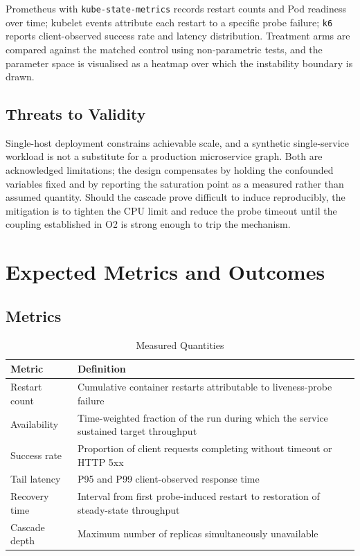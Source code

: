 \documentclass[conference]{IEEEtran}
\begin{document}
Prometheus with \texttt{kube-state-metrics} records restart counts and
Pod readiness over time; kubelet events attribute each restart to a
specific probe failure; \texttt{k6} reports client-observed success
rate and latency distribution. Treatment arms are compared against the
matched control using non-parametric tests, and the parameter space is
visualised as a heatmap over which the instability boundary is drawn.

\subsection{Threats to Validity}

Single-host deployment constrains achievable scale, and a synthetic
single-service workload is not a substitute for a production
microservice graph. Both are acknowledged limitations; the design
compensates by holding the confounded variables fixed and by reporting
the saturation point as a measured rather than assumed quantity.
Should the cascade prove difficult to induce reproducibly, the
mitigation is to tighten the CPU limit and reduce the probe timeout
until the coupling established in O2 is strong enough to trip the
mechanism.

\section{Expected Metrics and Outcomes}

\subsection{Metrics}

\begin{table}[h]
\centering
\caption{Measured Quantities}
\label{tab:metrics}
\footnotesize
\begin{tabular}{@{}p{}p{}@{}}
\toprule
\textbf{Metric} & \textbf{Definition} \\
\midrule
Restart count & Cumulative container restarts attributable to
liveness-probe failure \\
\addlinespace
Availability & Time-weighted fraction of the run during which the
service sustained target throughput \\
\addlinespace
Success rate & Proportion of client requests completing without
timeout or HTTP 5xx \\
\addlinespace
Tail latency & P95 and P99 client-observed response time \\
\addlinespace
Recovery time & Interval from first probe-induced restart to
restoration of steady-state throughput \\
\addlinespace
Cascade depth & Maximum number of replicas simultaneously
unavailable \\
\bottomrule
\end{tabular}
\end{table}
\end{document}
